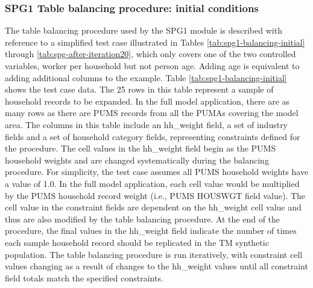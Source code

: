 \subsubsection{SPG1 Table balancing procedure: initial conditions}
The table balancing procedure used by the SPG1 module is described with reference to a simplified test case illustrated in Tables \ref{tab:spg1-balancing-initial} through \ref{tab:spg-after-iteration20}, which only covers one of the two controlled variables, worker per household but not person age. Adding age is equivalent to adding additional columns to the example. Table \ref{tab:spg1-balancing-initial} shows the test case data. The 25 rows in this table represent a sample of household records to be expanded. In the full model application, there are as many rows as there are PUMS records from all the PUMAs covering the model area. The columns in this table include an hh\_weight field, a set of industry fields and a set of household category fields, representing constraints defined for the procedure. The cell values in the hh\_weight field begin as the PUMS household weights and are changed systematically during the balancing procedure. For simplicity, the test case assumes all PUMS household weights have a value of 1.0. In the full model application, each cell value would be multiplied by the PUMS household record weight (i.e., PUMS HOUSWGT field value). The cell value in the constraint fields are dependent on the hh\_weight cell value and thus are also modified by the table balancing procedure. At the end of the procedure, the final values in the hh\_weight field indicate the number of times each sample household record should be replicated in the TM synthetic population. The table balancing procedure is run iteratively, with constraint cell values changing as a result of changes to the hh\_weight values until all constraint field totals match the specified constraints.

